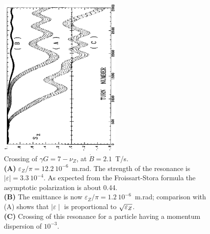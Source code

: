 \vfill
\vspace{-1cm}

\begin{figure}[H]
\centerline{\includegraphics[height=8cm,angle=-90]{FigC6-4.ps}}
\vspace{-.2cm}
\caption[FigC64]{\label{figC64} \small
Crossing of	$ \gamma G=7-\nu_ Z	$, at $	\dot  B=2.1	$~T/s. \\
\textbf{(A)}	$ \varepsilon_ Z/\pi =12.2\	10^{-6}	$~m.rad. The strength of the resonance is
$\mid \varepsilon \mid =3.3~10^{-4}	$.
As expected	from the Froissart-Stora formula the asymptotic	polarization is	about
0.44. \\
\textbf{(B)}	The	emittance is now $ \varepsilon_	Z/\pi =1.2\	10^{-6}	$~m.rad;
comparison with	(A)	shows that $\mid \varepsilon \mid$ is proportional to
$ \protect\sqrt{\varepsilon_Z}	$.	\\
\textbf{(C)}	Crossing of	this resonance for a particle having a momentum	dispersion of
$ 10^{-3} $.}
\end{figure}

\clearpage

\twocolumn

